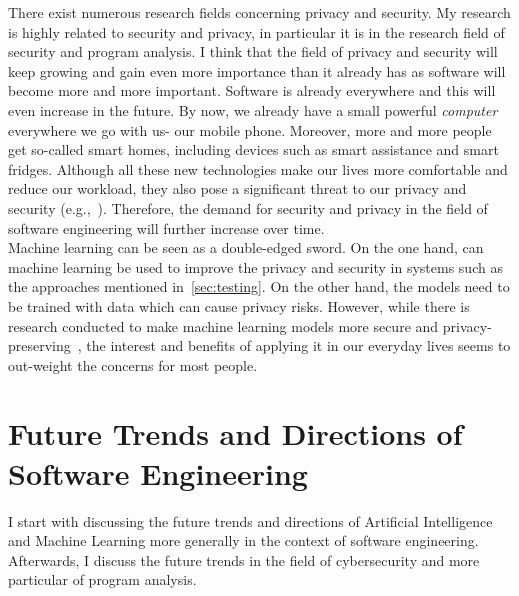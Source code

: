 \documentclass[11pt,a4paper]{article}
\begin{document}
There exist numerous research fields concerning privacy and security. My research is highly related to security and privacy, in particular it is in the research field of security and program analysis. I think that the field of privacy and security will keep growing and gain even more importance than it already has as software will become more and more important. Software is already everywhere and this will even increase in the future. By now, we already have a small powerful \textit{computer} everywhere we go with us- our mobile phone. Moreover, more and more people get so-called smart homes, including devices such as smart assistance and smart fridges. Although all these new technologies make our lives more comfortable and reduce our workload, they also pose a significant threat to our privacy and security (e.g.,~\cite{alexa}). Therefore, the demand for security and privacy in the field of software engineering will further increase over time.\\

Machine learning can be seen as a double-edged sword. On the one hand, can machine learning be used to improve the privacy and security in systems such as the approaches mentioned in~\ref{sec:testing}. On the other hand, the models need to be trained with data which can cause privacy risks. However, while there is research conducted to make machine learning models more secure and privacy-preserving~\cite{al2019privacy,papernot2016towards,abbas2022safety}, the interest and benefits of applying it in our everyday lives seems to out-weight the concerns for most people.  


\section{Future Trends and Directions of Software Engineering}
I start with discussing the future trends and directions of Artificial Intelligence and Machine Learning more generally in the context of software engineering. Afterwards, I discuss the future trends in the field of cybersecurity and more particular of program analysis.\\
\end{document}
